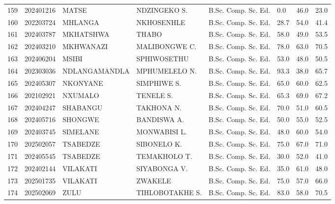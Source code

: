 \documentclass[12pt]{article}
\begin{document}
\begin{longtable}{@{}llllllll@{}}
159 & 202401216 & MATSE & NDZINGEKO S. & B.Sc. Comp. Sc. Ed. & 0.0 & 46.0 & 23.0 \\
160 & 202203724 & MHLANGA & NKHOSENHLE & B.Sc. Comp. Sc. Ed. & 28.7 & 54.0 & 41.4 \\
161 & 202403787 & MKHATSHWA & THABO & B.Sc. Comp. Sc. Ed. & 58.0 & 49.0 & 53.5 \\
162 & 202403210 & MKHWANAZI & MALIBONGWE C. & B.Sc. Comp. Sc. Ed. & 78.0 & 63.0 & 70.5 \\
163 & 202406204 & MSIBI & SPHIWOSETHU & B.Sc. Comp. Sc. Ed. & 53.0 & 48.0 & 50.5 \\
164 & 202303036 & NDLANGAMANDLA & MPHUMELELO N. & B.Sc. Comp. Sc. Ed. & 93.3 & 38.0 & 65.7 \\
165 & 202405307 & NKONYANE & SIMPHIWE S. & B.Sc. Comp. Sc. Ed. & 65.0 & 60.0 & 62.5 \\
166 & 202102921 & NXUMALO & TENELE S. & B.Sc. Comp. Sc. Ed. & 65.3 & 69.0 & 67.2 \\
167 & 202404247 & SHABANGU & TAKHONA N. & B.Sc. Comp. Sc. Ed. & 70.0 & 51.0 & 60.5 \\
168 & 202405716 & SHONGWE & BANDISWA A. & B.Sc. Comp. Sc. Ed. & 50.0 & 55.0 & 52.5 \\
169 & 202403745 & SIMELANE & MONWABISI L. & B.Sc. Comp. Sc. Ed. & 48.0 & 60.0 & 54.0 \\
170 & 202502057 & TSABEDZE & SIBONELO K. & B.Sc. Comp. Sc. Ed. & 75.0 & 67.0 & 71.0 \\
171 & 202405545 & TSABEDZE & TEMAKHOLO T. & B.Sc. Comp. Sc. Ed. & 30.0 & 52.0 & 41.0 \\
172 & 202402144 & VILAKATI & SIYABONGA V. & B.Sc. Comp. Sc. Ed. & 35.0 & 61.0 & 48.0 \\
173 & 202501735 & VILAKATI & ZWAKELE & B.Sc. Comp. Sc. Ed. & 75.0 & 57.0 & 66.0 \\
174 & 202502069 & ZULU & TIHLOBOTAKHE S. & B.Sc. Comp. Sc. Ed. & 83.0 & 58.0 & 70.5 \\


\end{longtable}
\end{document}
